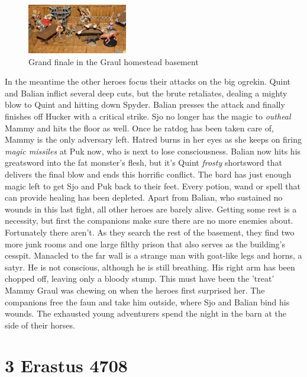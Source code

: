 \begin{figure}[h]
	\centering
	\includegraphics[width=0.39\textwidth]{images/Grand-finale-in-the-Graul-homestead-basement-512310881.jpg}
	\caption{Grand finale in the Graul homestead basement}
	\label{fig:Grand-finale-in-the-Graul-homestead-basement-512310881}
\end{figure}

In the meantime the other heroes focus their attacks on the big ogrekin. Quint and Balian inflict several deep cuts, but the brute retaliates, dealing a mighty blow to Quint and hitting down Spyder. Balian presses the attack and finally finishes off Hucker with a critical strike. Sjo no longer has the magic to {\itshape outheal} Mammy and hits the floor as well. Once he ratdog has been taken care of, Mammy is the only adversary left. Hatred burns in her eyes as she keeps on firing  {\itshape magic missiles} at Puk now, who is next to lose consciousness. Balian now hits his greatsword into the fat monster's flesh, but it's Quint  {\itshape frosty} shortsword that delivers the final blow and ends this horrific conflict. The bard has just enough magic left to get Sjo and Puk back to their feet. Every potion, wand or spell that can provide healing has been depleted. Apart from Balian, who sustained no wounds in this last fight, all other heroes are barely alive. Getting some rest is a necessity, but first the companions make sure there are no more enemies about. Fortunately there aren't. As they search the rest of the basement, they find two more junk rooms and one large filthy prison that also serves as the building's cesspit. Manacled to the far wall is a strange man with goat-like legs and horns, a satyr. He is not conscious, although he is still breathing. His right arm has been chopped off, leaving only a bloody stump. This must have been the 'treat' Mammy Graul was chewing on when the heroes first surprised her. The companions free the faun and take him outside, where Sjo and Balian bind his wounds. The exhausted young adventurers spend the night in the barn at the side of their horses.\\

\section{3 Erastus 4708}


